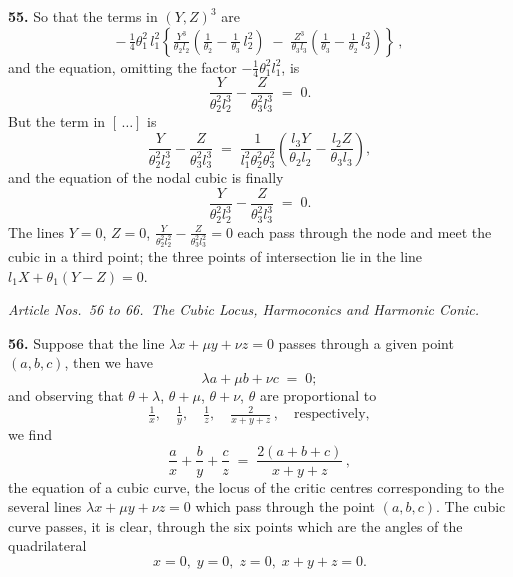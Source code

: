 \documentclass[11pt,a4paper]{article}
\begin{document}
\textbf{55.} So that the terms in $(Y,Z)^{3}$ are
\[
-\,\tfrac{1}{4}\theta_{1}^{2}\,l_{1}^{2}\!\left\{\tfrac{Y^{3}}{\theta_{2}l_{2}}\!\left(\tfrac{1}{\theta_{2}}-\tfrac{1}{\theta_{3}}\,l_{2}^{2}\right)\;-\;\tfrac{Z^{3}}{\theta_{3}l_{3}}\!\left(\tfrac{1}{\theta_{3}}-\tfrac{1}{\theta_{2}}\,l_{3}^{2}\right)\right\}\,,
\]
and the equation, omitting the factor $-\tfrac{1}{4}\theta_{1}^{2}l_{1}^{2}$, is
\[
\frac{Y}{\theta_{2}^{2}l_{2}^{3}} - \frac{Z}{\theta_{3}^{2}l_{3}^{3}} \;=\; 0.
\]
But the term in $[\,\ldots]$ is
\[
\frac{Y}{\theta_{2}^{2}l_{2}^{3}} - \frac{Z}{\theta_{3}^{2}l_{3}^{3}} \;=\; \frac{1}{l_{1}^{2}\theta_{2}^{2}\theta_{3}^{2}}\!\left(\frac{l_{3}Y}{\theta_{2}l_{2}} - \frac{l_{2}Z}{\theta_{3}l_{3}}\right),
\]
and the equation of the nodal cubic is finally
\[
\frac{Y}{\theta_{2}^{2}l_{2}^{3}} - \frac{Z}{\theta_{3}^{2}l_{3}^{3}} \;=\; 0.
\]
The lines $Y=0$, $Z=0$, $\tfrac{Y}{\theta_{2}^{2}l_{2}^{2}} - \tfrac{Z}{\theta_{3}^{2}l_{3}^{2}}=0$ each pass through the node and meet the cubic in a third point; the three points of intersection lie in the line $l_{1}X + \theta_{1}(Y-Z) = 0$.

\medskip

\noindent\textit{Article Nos.\ 56 to 66.\ The Cubic Locus, Harmoconics and Harmonic Conic.}

\medskip

\textbf{56.} Suppose that the line $\lambda x + \mu y + \nu z = 0$ passes through a given point $(a,b,c)$, then we have
\[
\lambda a + \mu b + \nu c \;=\; 0;
\]
and observing that $\theta+\lambda$, $\theta+\mu$, $\theta+\nu$, $\theta$ are proportional to
\[
\tfrac{1}{x},\quad \tfrac{1}{y},\quad \tfrac{1}{z},\quad \tfrac{2}{x+y+z}\,,\quad\text{respectively},
\]
we find
\[
\frac{a}{x} + \frac{b}{y} + \frac{c}{z} \;=\; \frac{2(a+b+c)}{x+y+z}\,,
\]
the equation of a cubic curve, the locus of the critic centres corresponding to the several lines $\lambda x + \mu y + \nu z = 0$ which pass through the point $(a,b,c)$. The cubic curve passes, it is clear, through the six points which are the angles of the quadrilateral
\[
x=0,\;y=0,\;z=0,\;x+y+z=0.
\]

\medskip
\end{document}
